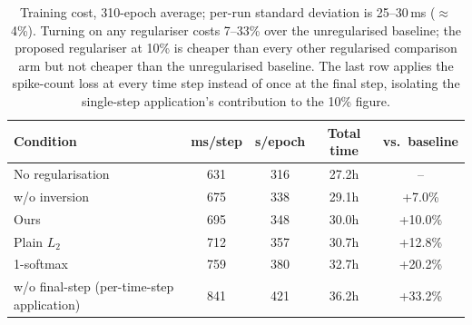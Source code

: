 \begin{table}
\centering
\small
\begin{tabular}{lcccc}
\toprule
Condition & ms/step & s/epoch & Total time & vs.\ baseline \\
\midrule
No regularisation & 631 & 316 & 27.2h & -- \\
w/o inversion & 675 & 338 & 29.1h & +7.0\% \\
Ours & 695 & 348 & 30.0h & +10.0\% \\
Plain $L_2$ & 712 & 357 & 30.7h & +12.8\% \\
1-softmax & 759 & 380 & 32.7h & +20.2\% \\
w/o final-step (per-time-step application) & 841 & 421 & 36.2h & +33.2\% \\
\bottomrule
\end{tabular}
\caption{Training cost, 310-epoch average; per-run standard deviation is 25--30\,ms ($\approx$4\%). Turning on any regulariser costs 7--33\% over the unregularised baseline; the proposed regulariser at 10\% is cheaper than every other regularised comparison arm but not cheaper than the unregularised baseline. The last row applies the spike-count loss at every time step instead of once at the final step, isolating the single-step application's contribution to the 10\% figure.}
\label{tab:t4_cost}
\end{table}
